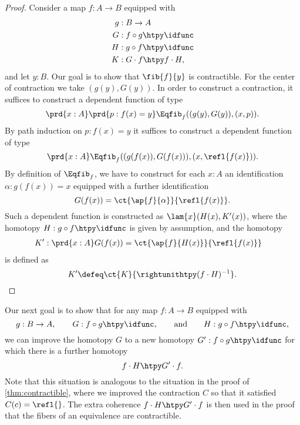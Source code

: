   \begin{proof}
    Consider a map $f:A\to B$ equipped with
    \begin{align*}
      g & : B \to A \\
      G & : f \circ g \htpy \idfunc \\
      H & : g \circ f \htpy \idfunc \\
      K & : G \cdot f \htpy f \cdot H,
    \end{align*}
    and let $y:B$. Our goal is to show that $\fib{f}{y}$ is contractible. For the center of contraction we take $(g(y),G(y))$. In order to construct a contraction, it suffices to construct a dependent function of type
    \begin{equation*}
      \prd{x:A}\prd{p:f(x)=y}\Eqfib_f((g(y),G(y)),(x,p)).
    \end{equation*}
    By path induction on $p:f(x)=y$ it suffices to construct a dependent function of type
    \begin{equation*}
      \prd{x:A}\Eqfib_f((g(f(x)),G(f(x))),(x,\refl{f(x)})).
    \end{equation*}
    By definition of $\Eqfib_f$, we have to construct for each $x:A$ an identification $\alpha:g(f(x))=x$ equipped with a further identification
    \begin{equation*}
      G(f(x))=\ct{\ap{f}{\alpha}}{\refl{f(x)}}.
    \end{equation*}
    Such a dependent function is constructed as $\lam{x}(H(x),K'(x))$, where the homotopy $H:g\circ f\htpy \idfunc$ is given by assumption, and the homotopy
    \begin{align*}
      K' & : \prd{x:A}G(f(x))=\ct{\ap{f}{H(x)}}{\refl{f(x)}}
    \end{align*}
    is defined as
    \begin{equation*}
      K'\defeq \ct{K}{\rightunithtpy(f\cdot H)^{-1}}.\qedhere
    \end{equation*}
  \end{proof}

  Our next goal is to show that for any map $f:A\to B$ equipped with
  \begin{equation*}
    g:B\to A,\qquad G:f\circ g \htpy \idfunc,\qquad\text{and}\qquad H:g\circ f\htpy \idfunc,
  \end{equation*}
  we can improve the homotopy $G$ to a new homotopy $G':f\circ g\htpy \idfunc$ for which there is a further homotopy
  \begin{equation*}
    f\cdot H\htpy G'\cdot f.
  \end{equation*}
  Note that this situation is analogous to the situation in the proof of \cref{thm:contractible}, where we improved the contraction $C$ so that it satisfied $C(c)=\refl{}$. The extra coherence $f\cdot H\htpy G'\cdot f$ is then used in the proof that the fibers of an equivalence are contractible.


